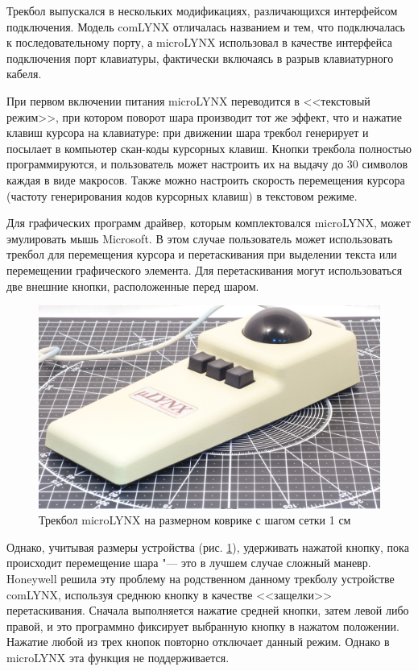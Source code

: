 \documentclass[11pt, a4paper]{article}
\begin{document}
Трекбол выпускался в нескольких модификациях, различающихся интерфейсом подключения. Модель comLYNX отличалась названием и тем, что подключалась к последовательному порту, а microLYNX использовал в качестве интерфейса подключения порт клавиатуры, фактически включаясь в разрыв клавиатурного кабеля.

При первом включении питания microLYNX переводится в <<текстовый режим>>, при котором поворот шара производит тот же эффект, что и нажатие клавиш курсора на клавиатуре: при движении шара трекбол генерирует и посылает в компьютер скан-коды курсорных клавиш. Кнопки трекбола
полностью программируются, и пользователь может настроить их на выдачу до 30 символов каждая в виде макросов. Также можно настроить
скорость перемещения курсора (частоту генерирования кодов курсорных клавиш) в текстовом режиме.

Для графических программ драйвер, которым комплектовался microLYNX, может эмулировать мышь Microsoft. В этом случае пользователь может использовать трекбол для перемещения курсора и перетаскивания при выделении текста или перемещении графического элемента. Для перетаскивания могут использоваться две внешние кнопки, расположенные перед шаром.

\begin{figure}[h]
    \centering
    \includegraphics[scale=0.3]{1986_honeywell_microlynx_trackball/size.jpg}
    \caption{Трекбол microLYNX на размерном коврике с шагом сетки 1 см}
    \label{fig:microLYNXSize}
\end{figure}

Однако, учитывая размеры устройства (рис. \ref{fig:microLYNXSize}), удерживать нажатой кнопку, пока происходит
перемещение шара "--- это в лучшем случае сложный маневр. Honeywell решила
эту проблему на родственном данному трекболу устройстве comLYNX, используя
среднюю кнопку в качестве <<защелки>> перетаскивания. Сначала выполняется нажатие средней кнопки, затем левой либо правой, и это
программно фиксирует выбранную кнопку в нажатом положении. Нажатие любой из трех кнопок повторно
отключает данный режим. Однако в microLYNX эта функция не поддерживается.
\end{document}
